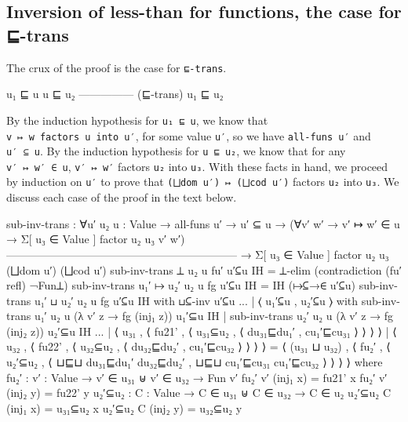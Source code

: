 \hypertarget{inversion-of-less-than-for-functions-the-case-for--trans}{%
\subsection{Inversion of less-than for functions, the case for
⊑-trans}\label{inversion-of-less-than-for-functions-the-case-for--trans}}

The crux of the proof is the case for \texttt{⊑-trans}.

\begin{myDisplay}
u₁ ⊑ u   u ⊑ u₂
--------------- (⊑-trans)
    u₁ ⊑ u₂
\end{myDisplay}

By the induction hypothesis for \texttt{u₁\ ⊑\ u}, we know that
\texttt{v\ ↦\ w\ factors\ u\ into\ u′}, for some value \texttt{u′}, so
we have \texttt{all-funs\ u′} and \texttt{u′\ ⊆\ u}. By the induction
hypothesis for \texttt{u\ ⊑\ u₂}, we know that for any
\texttt{v′\ ↦\ w′\ ∈\ u}, \texttt{v′\ ↦\ w′} factors \texttt{u₂} into
\texttt{u₃}. With these facts in hand, we proceed by induction on
\texttt{u′} to prove that \texttt{(⨆dom\ u′)\ ↦\ (⨆cod\ u′)} factors
\texttt{u₂} into \texttt{u₃}. We discuss each case of the proof in the
text below.

\begin{fence}
\begin{code}
sub-inv-trans : ∀{u′ u₂ u : Value}
    → all-funs u′  →  u′ ⊆ u
    → (∀{v′ w′} → v′ ↦ w′ ∈ u → Σ[ u₃ ∈ Value ] factor u₂ u₃ v′ w′)
      ---------------------------------------------------------------
    → Σ[ u₃ ∈ Value ] factor u₂ u₃ (⨆dom u′) (⨆cod u′)
sub-inv-trans {⊥} {u₂} {u} fu′ u′⊆u IH =
   ⊥-elim (contradiction (fu′ refl) ¬Fun⊥)
sub-inv-trans {u₁′ ↦ u₂′} {u₂} {u} fg u′⊆u IH = IH (↦⊆→∈ u′⊆u)
sub-inv-trans {u₁′ ⊔ u₂′} {u₂} {u} fg u′⊆u IH
    with ⊔⊆-inv u′⊆u
... | ⟨ u₁′⊆u , u₂′⊆u ⟩
    with sub-inv-trans {u₁′} {u₂} {u} (λ {v′} z → fg (inj₁ z)) u₁′⊆u IH
       | sub-inv-trans {u₂′} {u₂} {u} (λ {v′} z → fg (inj₂ z)) u₂′⊆u IH
... | ⟨ u₃₁ , ⟨ fu21' , ⟨ u₃₁⊆u₂ , ⟨ du₃₁⊑du₁′ , cu₁′⊑cu₃₁ ⟩ ⟩ ⟩ ⟩
    | ⟨ u₃₂ , ⟨ fu22' , ⟨ u₃₂⊆u₂ , ⟨ du₃₂⊑du₂′ , cu₁′⊑cu₃₂ ⟩ ⟩ ⟩ ⟩ =
      ⟨ (u₃₁ ⊔ u₃₂) , ⟨ fu₂′ , ⟨ u₂′⊆u₂ ,
      ⟨ ⊔⊑⊔ du₃₁⊑du₁′ du₃₂⊑du₂′ ,
        ⊔⊑⊔ cu₁′⊑cu₃₁ cu₁′⊑cu₃₂ ⟩ ⟩ ⟩ ⟩
    where fu₂′ : {v′ : Value} → v′ ∈ u₃₁ ⊎ v′ ∈ u₃₂ → Fun v′
          fu₂′ {v′} (inj₁ x) = fu21' x
          fu₂′ {v′} (inj₂ y) = fu22' y
          u₂′⊆u₂ : {C : Value} → C ∈ u₃₁ ⊎ C ∈ u₃₂ → C ∈ u₂
          u₂′⊆u₂ {C} (inj₁ x) = u₃₁⊆u₂ x
          u₂′⊆u₂ {C} (inj₂ y) = u₃₂⊆u₂ y
\end{code}
\end{fence}

